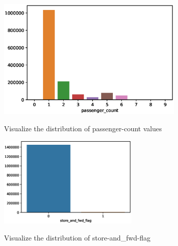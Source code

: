 \begin{figure}
  \centering
   \includegraphics[width=0.8\textwidth]{figure//fig-2.eps}\\
  \caption{Visualize the distribution of passenger-count values}\label{fig:demical1}
\end{figure}

\begin{figure}
  \centering
   \includegraphics[width=0.6\textwidth]{figure//fig-4.eps}\\
  \caption{Visualize the distribution of store-and_fwd-flag}\label{fig:demical1}
\end{figure}

